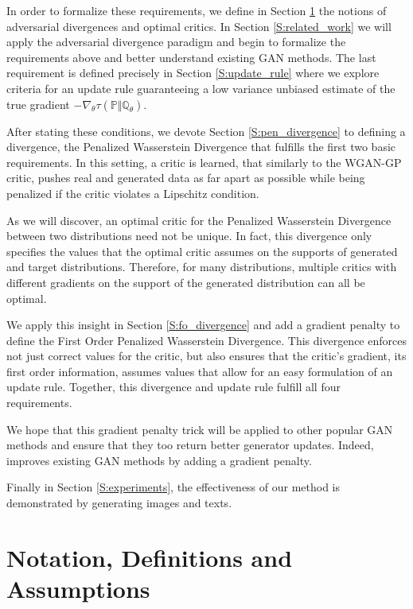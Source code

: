 \documentclass{article}
\begin{document}
 In order to formalize these requirements, we define in Section \ref{S:notation} the notions of adversarial divergences and
 optimal critics. In Section \ref{S:related_work} we will apply
 the adversarial divergence paradigm and begin to formalize the requirements above and better understand existing GAN methods.
 The last requirement is defined precisely in Section \ref{S:update_rule} where we explore criteria for an update rule guaranteeing a low
 variance unbiased estimate of the true gradient $-\nabla_\theta\tau(\mathbb P\Vert\mathbb Q_\theta)$.

 After stating these conditions, we devote Section \ref{S:pen_divergence} to defining
 a divergence, the Penalized Wasserstein Divergence that fulfills the first
 two basic requirements. In this setting, a critic is learned, that similarly to the WGAN-GP critic, pushes real and generated
 data as far apart as possible while being penalized if the critic violates a Lipschitz condition.

 As we will discover, an optimal critic for the Penalized Wasserstein Divergence between two distributions need not be unique.
 In fact, this divergence only specifies the values that the optimal critic assumes on the supports of generated and target distributions.
 Therefore, for many distributions, multiple critics with different gradients on the support of the generated distribution can all be optimal.

 We apply this insight in Section \ref{S:fo_divergence} and add a gradient penalty to define the
 First Order Penalized Wasserstein Divergence. This divergence enforces not just correct values for the critic, but also
 ensures that the critic's gradient, its first order information, assumes values that allow for an easy formulation of an update rule.
 Together, this divergence and update rule fulfill all four requirements.

 We hope that this gradient penalty trick will be applied to other popular GAN methods and ensure that they too return better generator updates.
 Indeed, \cite{fedus2017many} improves existing GAN methods by adding a gradient penalty.

 Finally in Section \ref{S:experiments}, the effectiveness of our method is demonstrated by generating
 images and texts.

 \section{Notation, Definitions and Assumptions}\label{S:notation}
\end{document}
